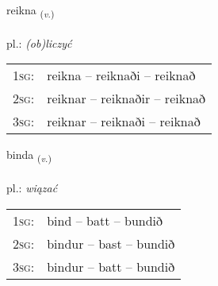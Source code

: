\documentclass[frontgrid, backgrid]{flacards}\usepackage[]{graphicx}\usepackage[]{xcolor}
\begin{document}
\renewcommand{\flhead}{\vskip5pt \fboxsep=0pt {\small\bfseries\footnotesize Sagnorð | czasownik}}
\renewcommand{\fcfoot}{\vskip5pt \fboxsep=0pt \hspace{2pt}{\small\bfseries\footnotesize 1K}}

\renewcommand{\blhead}{\vskip5pt {\small\bfseries\footnotesize Sagnorð | czasownik }}
\renewcommand{\bcfoot}{\vskip5pt \hspace{2pt}{\small\bfseries\footnotesize 1K}}


{reikna \small{\textsubscript{(\textit{v.})}} \\[1ex] %
\textphonetic{[reihkna]} \\
pl.: \emph{(ob)liczyć} \\  [2ex]
\renewcommand*{\arraystretch}{0.8}
\begin{tabular}{p{1cm}l}
\textsc{1sg}: & reikna -- reiknaði -- reiknað \\ 
\textsc{2sg}: & reiknar -- reiknaðir -- reiknað \\ 
\textsc{3sg}: & reiknar -- reiknaði -- reiknað \\ 
\end{tabular}
}

\renewcommand{\flhead}{\vskip5pt \fboxsep=0pt {\small\bfseries\footnotesize Sagnorð | czasownik}}
\renewcommand{\fcfoot}{\vskip5pt \fboxsep=0pt \hspace{2pt}{\small\bfseries\footnotesize 1K}}

\renewcommand{\blhead}{\vskip5pt {\small\bfseries\footnotesize Sagnorð | czasownik }}
\renewcommand{\bcfoot}{\vskip5pt \hspace{2pt}{\small\bfseries\footnotesize 1K}}


{binda \small{\textsubscript{(\textit{v.})}} \\[1ex] %
\textphonetic{[pɪnta]} \\
pl.: \emph{wiązać} \\  [2ex]
\renewcommand*{\arraystretch}{0.8}
\begin{tabular}{p{1cm}l}
\textsc{1sg}: & bind -- batt -- bundið \\ 
\textsc{2sg}: & bindur -- bast -- bundið \\ 
\textsc{3sg}: & bindur -- batt -- bundið \\ 
\end{tabular}
}
\end{document}
